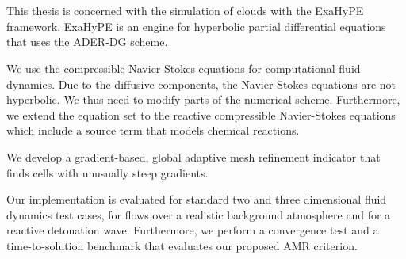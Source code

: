 \chapter{\abstractname}
This thesis is concerned with the simulation of clouds with the ExaHyPE framework.
ExaHyPE is an engine for hyperbolic partial differential equations that uses the ADER-DG scheme.

We use the compressible Navier-Stokes equations for computational fluid dynamics.
Due to the diffusive components, the Navier-Stokes equations are not hyperbolic.
We thus need to modify parts of the numerical scheme.
Furthermore, we extend the equation set to the reactive compressible Navier-Stokes equations which include a source term that models chemical reactions.

We develop a gradient-based, global adaptive mesh refinement indicator that finds cells with unusually steep gradients.

Our implementation is evaluated for standard two and three dimensional fluid dynamics test cases, for flows over a realistic background atmosphere and for a reactive detonation wave.
Furthermore, we perform a convergence test and a time-to-solution benchmark that evaluates our proposed AMR criterion.

